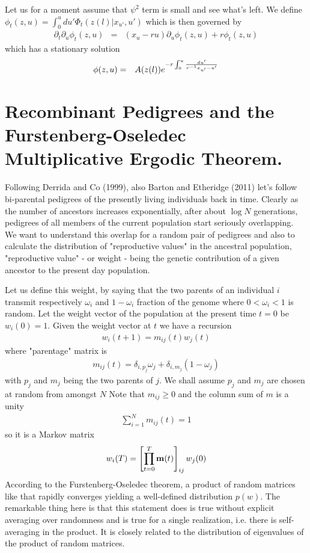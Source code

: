 \documentclass{article}
\begin{document}
Let us for a moment assume that $\psi^2$ term is small and see what's left. We define $\phi_t(z,u)=\int_{0}^u du'  \Phi_t (z(l)| x_{u'},u')$
which is then governed by
\begin{eqnarray}
\partial_t \partial_u \phi_t (z,u)&=& (x_u-ru ) \partial_u \phi_t (z,u)+ r \phi_t (z,u)
\end{eqnarray}
which has a stationary solution
\begin{eqnarray}
 \phi (z,u)&=& A(z(l)) e^{ -r \int_0^u  {du' \over r^{-1}x_{u'}-u' }}
\end{eqnarray}

\section*{Recombinant Pedigrees and the Furstenberg-Oseledec Multiplicative Ergodic Theorem.}
Following Derrida and Co (1999), also Barton and Etheridge (2011) let's follow bi-parental pedigrees of the presently living individuals
back in time. Clearly as the number of ancestors increases exponentially, after about $\log N$ generations, pedigrees of all members of the current population start seriously overlapping. We want to understand this overlap for a random pair of pedigrees and also to calculate the distribution of "reproductive values" in the ancestral population, "reproductive value" - or weight - being the genetic contribution of a given ancestor to the present day population. 

Let us define this weight, by saying that the two parents of an individual $i$ transmit respectively $\omega_i$ and $1-\omega_i$ fraction of the genome where $0<\omega_i<1$ is random. Let the weight vector of the population at the present time $t=0$ be
$w_i(0)=1$. Given the weight vector at $t$ we have a recursion
\begin{eqnarray}
w_i(t+1)=m_{ij}(t)w_j(t)
\end{eqnarray}
where "parentage" matrix is
\begin{eqnarray}
m_{ij}(t)=\delta_{i,p_j}\omega_j+\delta_{i,m_j}(1-\omega_j)
\end{eqnarray}
with $p_j$ and $m_j$ being the two parents of $j$. We shall assume $p_j$ and $m_j$ are chosen at random from amongst $N$
Note that $m_{ij} \ge 0$ and the column sum of $m$ is a unity
\begin{eqnarray}
\sum_{i=1}^N m_{ij}(t)=1
\end{eqnarray}
so it is a Markov matrix
\begin{eqnarray}
w_{i}(T)=\left [ \prod_{t=0}^T {\bf m} (t) \right ]_{ij} w_j(0)
\end{eqnarray}
According to the Furstenberg-Oseledec theorem, a product of random matrices like that rapidly converges yielding a well-defined distribution $p(w)$. The remarkable thing here is that this statement does is true without explicit averaging over randomness and is true for a single realization, i.e. there is self-averaging in the product. It is closely related to the distribution of eigenvalues of the product of random matrices.
\end{document}
